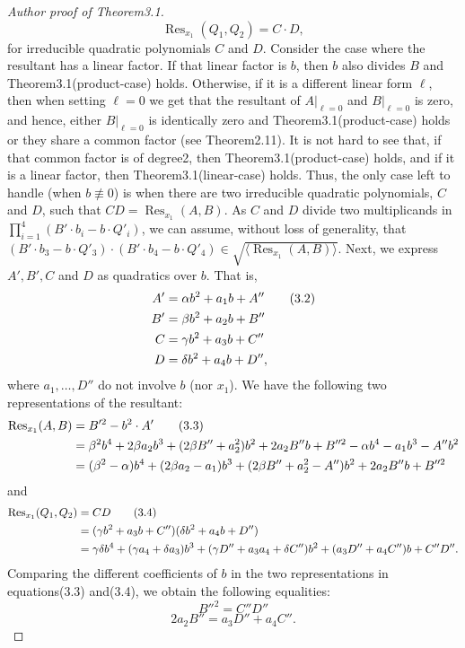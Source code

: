 \documentclass[10pt,a4paper]{article}
\renewcommand{\C}{\mathbb{C}}
\begin{document}
\begin{proof}[Author proof of Theorem3.1]
\[\operatorname{Res}_{x_1}(Q_1,Q_2)=C\cdot D,\]
for irreducible quadratic polynomials $C$ and $D$.
Consider the case where the resultant has a linear factor. If that linear factor is $b$, then $b$ also divides $B$ and Theorem3.1(product-case) holds. Otherwise, if it is a different linear form $\ell$, then when setting $\ell=0$ we get that the resultant of $A|_{\ell=0}$ and $B|_{\ell=0}$ is zero, and hence, either $B|_{\ell=0}$ is identically zero and Theorem3.1(product-case) holds or they share a common factor (see Theorem2.11). It is not hard to see that, if that common factor is of degree2, then Theorem3.1(product-case) holds, and if it is a linear factor, then Theorem3.1(linear-case) holds.
Thus, the only case left to handle (when $b\not\equiv0$) is when there are two irreducible quadratic polynomials, $C$ and $D$, such that $CD=\operatorname{Res}_{x_1}(A,B)$. As $C$ and $D$ divide two multiplicands in $\prod_{i=1}^4(B'\cdot b_i-b\cdot Q'_i)$, we can assume, without loss of generality, that $(B'\cdot b_3-b\cdot Q'_3)\cdot(B'\cdot b_4-b\cdot Q'_4)\in\sqrt{\langle\operatorname{Res}_{x_1}(A,B)\rangle}$. Next, we express $A',B',C$ and $D$ as quadratics over $b$. That is,
\begin{align}A'&=\alpha b^2+a_1b+A''\tag{3.2}\\B'&=\beta b^2+a_2b+B''\notag\\C&=\gamma b^2+a_3b+C''\notag\\D&=\delta b^2+a_4b+D'',\notag\end{align}
where $a_1,\ldots,D''$ do not involve $b$ (nor $x_1$). We have the following two representations of the resultant:
\begin{align}\operatorname{Res}_{x_1}(A,B)&=B'^2-b^2\cdot A'\tag{3.3}\\&=\beta^2b^4+2\beta a_2b^3+(2\beta B''+a_2^2)b^2+2a_2B''b+B''^2-\alpha b^4-a_1b^3-A''b^2\notag\\&=(\beta^2-\alpha)b^4+(2\beta a_2-a_1)b^3+(2\beta B''+a_2^2-A'')b^2+2a_2B''b+B''^2\notag\end{align}
and
\begin{align}\operatorname{Res}_{x_1}(Q_1,Q_2)&=CD\tag{3.4}\\&=(\gamma b^2+a_3b+C'')(\delta b^2+a_4b+D'')\notag\\&=\gamma\delta b^4+(\gamma a_4+\delta a_3)b^3+(\gamma D''+a_3a_4+\delta C'')b^2+(a_3D''+a_4C'')b+C''D''.\notag\end{align}
Comparing the different coefficients of $b$ in the two representations in equations(3.3) and(3.4), we obtain the following equalities:
\begin{equation}B''^2=C''D''\tag{3.5}\end{equation}
\begin{equation}2a_2B''=a_3D''+a_4C''.\tag{3.6}\end{equation}


\end{proof}
\end{document}
